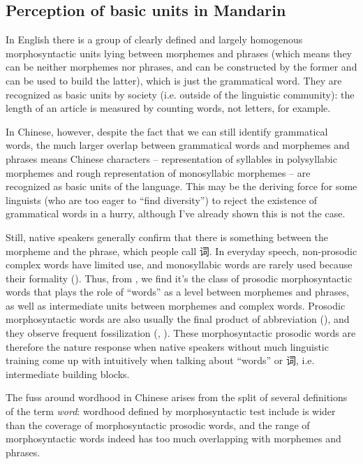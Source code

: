 \documentclass[UTF8, a4paper, oneside, scheme=plain, 12pt]{ctexrep}
\newcommand*{\term}[1]{\emph{#1}}
\begin{document}
\subsection{Perception of basic units in Mandarin}\label{sec:pos.word.perception}

In English there is a group of clearly defined and largely homogenous morphosyntactic units 
lying between morphemes and phrases
(which means they can be neither morphemes nor phrases,
and can be constructed by the former and can be used to build the latter),
which is just the grammatical word.
They are recognized as basic units by society 
(i.e. outside of the linguistic community):
the length of an article is measured by counting words, not letters, for example.

In Chinese, however, despite the fact that 
we can still identify grammatical words,
the much larger overlap between grammatical words and morphemes and phrases
means Chinese characters -- representation of syllables in polysyllabic morphemes 
and rough representation of monosyllabic morphemes -- 
are recognized as basic units of the language.
This may be the deriving force for some linguists 
(who are too eager to ``find diversity'')
to reject the existence of grammatical words in a hurry,
although I've already shown this is not the case.

Still, native speakers generally 
confirm that there is something between the morpheme and the phrase, 
which people call 词.
In everyday speech, 
non-prosodic complex words have limited use, 
and monosyllabic words are rarely used 
because their formality ().  
Thus, from , 
we find it's the class of prosodic morphosyntactic words 
that plays the role of ``words''
as a level between morphemes and phrases,
as well as intermediate units between morphemes and complex words.
Prosodic morphosyntactic words 
are also usually the final product 
of abbreviation (),
and they observe frequent fossilization
(,
).
These morphosyntactic prosodic words are therefore the nature response 
when native speakers without much linguistic training 
come up with intuitively when talking about ``words'' or 词,
i.e. intermediate building blocks.

The fuss around wordhood in Chinese 
arises from the split of several definitions of the term \term{word}:
wordhood defined by morphosyntactic test include is wider 
than the coverage of morphosyntactic prosodic words,
and the range of morphosyntactic words indeed 
has too much overlapping with morphemes and phrases.
\end{document}
